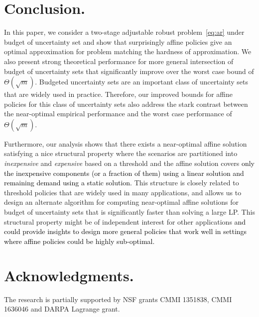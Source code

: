 \documentclass[moor]{informs1}              %
\newcommand*{\red}{\textcolor{black}}
\begin{document}
\section{Conclusion.}

In this paper, we consider a two-stage adjustable robust problem~\eqref{eq:ar} under budget of uncertainty set and show that surprisingly affine policies give an optimal approximation for problem matching the hardness of approximation. We also present strong theoretical performance for more general intersection of budget of uncertainty sets that significantly improve over the worst case bound of $\Theta(\sqrt m)$. Budgeted uncertainty sets are an important class of uncertainty sets that are widely used in practice. Therefore, our improved bounds for affine policies for this class of uncertainty sets also address the stark contrast between the near-optimal empirical performance and the worst case performance of 
$\Theta(\sqrt m)$. 

Furthermore, our analysis shows that there exists a near-optimal affine solution satisfying a nice structural property where the scenarios are partitioned into {\em inexpensive} and {\em expensive} based on a threshold and the affine solution covers \red{only the inexpensive components (or a fraction of them) using a linear solution and remaining demand using a static solution.} This structure is closely related to threshold policies that are widely used in many applications, and allows us to design an alternate algorithm for computing near-optimal affine solutions for budget of uncertainty sets that is significantly faster than solving a large LP. This structural property might be of independent interest for other applications \red{and could provide insights to design more general policies that work well in settings where affine policies could be highly sub-optimal.}


\section{Acknowledgments.} The research is partially supported by NSF grants CMMI 1351838, CMMI 1636046 and DARPA Lagrange grant.
\end{document}
